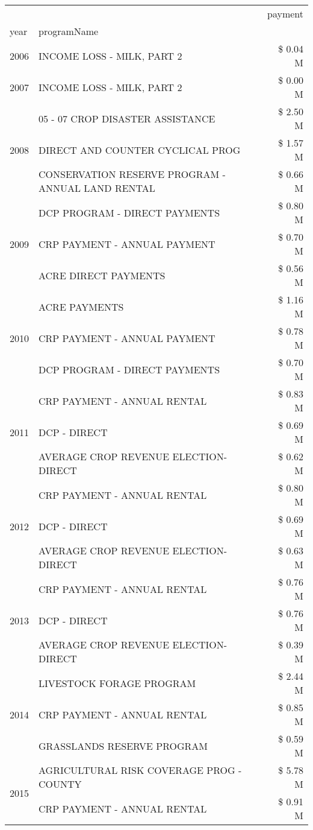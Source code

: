 \begin{tabular}{llr}
\toprule
 &  & payment \\
year & programName &  \\
\midrule
2006 & INCOME LOSS - MILK, PART 2 & \$ 0.04 M \\
\cline{1-3}
2007 & INCOME LOSS - MILK, PART 2 & \$ 0.00 M \\
\cline{1-3}
\multirow[t]{3}{*}{2008} & 05 - 07 CROP DISASTER ASSISTANCE & \$ 2.50 M \\
 & DIRECT AND COUNTER CYCLICAL PROG & \$ 1.57 M \\
 & CONSERVATION RESERVE PROGRAM - ANNUAL LAND RENTAL & \$ 0.66 M \\
\cline{1-3}
\multirow[t]{3}{*}{2009} & DCP PROGRAM - DIRECT PAYMENTS & \$ 0.80 M \\
 & CRP PAYMENT - ANNUAL PAYMENT & \$ 0.70 M \\
 & ACRE DIRECT PAYMENTS & \$ 0.56 M \\
\cline{1-3}
\multirow[t]{3}{*}{2010} & ACRE PAYMENTS & \$ 1.16 M \\
 & CRP PAYMENT - ANNUAL PAYMENT & \$ 0.78 M \\
 & DCP PROGRAM - DIRECT PAYMENTS & \$ 0.70 M \\
\cline{1-3}
\multirow[t]{3}{*}{2011} & CRP PAYMENT - ANNUAL RENTAL & \$ 0.83 M \\
 & DCP - DIRECT & \$ 0.69 M \\
 & AVERAGE CROP REVENUE ELECTION-DIRECT & \$ 0.62 M \\
\cline{1-3}
\multirow[t]{3}{*}{2012} & CRP PAYMENT - ANNUAL RENTAL & \$ 0.80 M \\
 & DCP - DIRECT & \$ 0.69 M \\
 & AVERAGE CROP REVENUE ELECTION-DIRECT & \$ 0.63 M \\
\cline{1-3}
\multirow[t]{3}{*}{2013} & CRP PAYMENT - ANNUAL RENTAL & \$ 0.76 M \\
 & DCP - DIRECT & \$ 0.76 M \\
 & AVERAGE CROP REVENUE ELECTION-DIRECT & \$ 0.39 M \\
\cline{1-3}
\multirow[t]{3}{*}{2014} & LIVESTOCK FORAGE PROGRAM & \$ 2.44 M \\
 & CRP PAYMENT - ANNUAL RENTAL & \$ 0.85 M \\
 & GRASSLANDS RESERVE PROGRAM & \$ 0.59 M \\
\cline{1-3}
\multirow[t]{3}{*}{2015} & AGRICULTURAL RISK COVERAGE PROG - COUNTY & \$ 5.78 M \\
 & CRP PAYMENT - ANNUAL RENTAL & \$ 0.91 M \\

\end{tabular}
